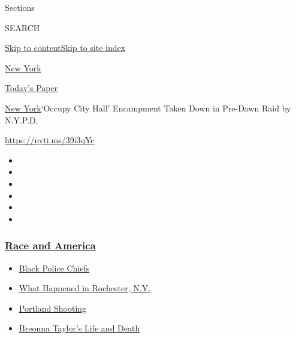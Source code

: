 Sections

SEARCH

\protect\hyperlink{site-content}{Skip to
content}\protect\hyperlink{site-index}{Skip to site index}

\href{https://www.nytimes3xbfgragh.onion/section/nyregion}{New York}

\href{https://myaccount.nytimes3xbfgragh.onion/auth/login?response_type=cookie\&client_id=vi}{}

\href{https://www.nytimes3xbfgragh.onion/section/todayspaper}{Today's
Paper}

\href{/section/nyregion}{New York}\textbar{}`Occupy City Hall'
Encampment Taken Down in Pre-Dawn Raid by N.Y.P.D.

\url{https://nyti.ms/39i3qYc}

\begin{itemize}
\item
\item
\item
\item
\item
\item
\end{itemize}

\hypertarget{race-and-america}{%
\subsubsection{\texorpdfstring{\href{https://www.nytimes3xbfgragh.onion/news-event/george-floyd-protests-minneapolis-new-york-los-angeles?name=styln-george-floyd\&region=TOP_BANNER\&block=storyline_menu_recirc\&action=click\&pgtype=Article\&impression_id=45b17c30-f4bc-11ea-bb85-6386371c57e7\&variant=undefined}{Race
and America}}{Race and America}}\label{race-and-america}}

\begin{itemize}
\tightlist
\item
  \href{https://www.nytimes3xbfgragh.onion/2020/09/11/us/black-police-chiefs-reform.html?name=styln-george-floyd\&region=TOP_BANNER\&block=storyline_menu_recirc\&action=click\&pgtype=Article\&impression_id=45b1a340-f4bc-11ea-bb85-6386371c57e7\&variant=undefined}{Black
  Police Chiefs}
\item
  \href{https://www.nytimes3xbfgragh.onion/2020/09/04/nyregion/rochester-police-daniel-prude.html?name=styln-george-floyd\&region=TOP_BANNER\&block=storyline_menu_recirc\&action=click\&pgtype=Article\&impression_id=45b1a341-f4bc-11ea-bb85-6386371c57e7\&variant=undefined}{What
  Happened in Rochester, N.Y.}
\item
  \href{https://www.nytimes3xbfgragh.onion/2020/08/30/us/portland-shooting-explained.html?name=styln-george-floyd\&region=TOP_BANNER\&block=storyline_menu_recirc\&action=click\&pgtype=Article\&impression_id=45b8a820-f4bc-11ea-bb85-6386371c57e7\&variant=undefined}{Portland
  Shooting}
\item
  \href{https://www.nytimes3xbfgragh.onion/2020/08/30/us/breonna-taylor-police-killing.html?name=styln-george-floyd\&region=TOP_BANNER\&block=storyline_menu_recirc\&action=click\&pgtype=Article\&impression_id=45b8a821-f4bc-11ea-bb85-6386371c57e7\&variant=undefined}{Breonna
  Taylor's Life and Death}
\end{itemize}

